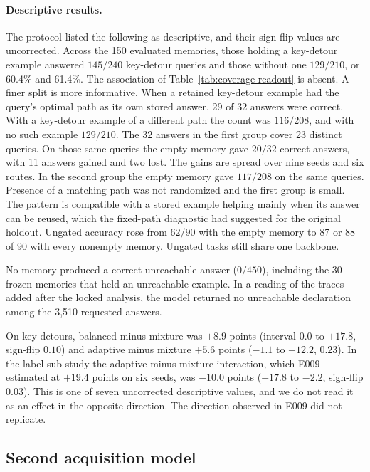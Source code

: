 \documentclass[11pt]{article}
\begin{document}
\paragraph{Descriptive results.} The protocol listed the following as
descriptive, and their sign-flip values are uncorrected. Across the 150
evaluated memories, those holding a key-detour example answered
$145/240$ key-detour queries and those without one $129/210$, or
60.4\% and 61.4\%. The association of Table~\ref{tab:coverage-readout}
is absent. A finer split is more informative. When a retained
key-detour example had the query's optimal path as its own stored
answer, 29 of 32 answers were correct. With a key-detour example of a
different path the count was $116/208$, and with no such example
$129/210$. The 32 answers in the first group cover 23 distinct queries.
On those same queries the empty memory gave $20/32$ correct answers,
with 11 answers gained and two lost. The gains are spread over nine
seeds and six routes. In the second group the empty
memory gave $117/208$ on the same queries. Presence of a matching path
was not randomized and the first group is small. The pattern is
compatible with a stored example helping mainly when its answer can be
reused, which the fixed-path
diagnostic had suggested for the original holdout. Ungated accuracy
rose from $62/90$ with the empty memory to 87 or 88 of 90 with every
nonempty memory. Ungated tasks still share one backbone.

No memory produced a correct unreachable answer ($0/450$), including
the 30 frozen memories that held an unreachable example. In a reading
of the traces added after the locked analysis, the model returned no
unreachable declaration among the 3,510 requested answers.

On key detours, balanced minus mixture was $+8.9$ points (interval
$0.0$ to $+17.8$, sign-flip $0.10$) and adaptive minus mixture $+5.6$
points ($-1.1$ to $+12.2$, $0.23$). In the label sub-study the
adaptive-minus-mixture interaction, which E009 estimated at $+19.4$
points on six seeds, was $-10.0$ points ($-17.8$ to $-2.2$, sign-flip
$0.03$). This is one of seven uncorrected descriptive values, and we do
not read it as an effect in the opposite direction. The direction
observed in E009 did not replicate.

\subsection{Second acquisition model}
\label{sec:second-model}
\end{document}
